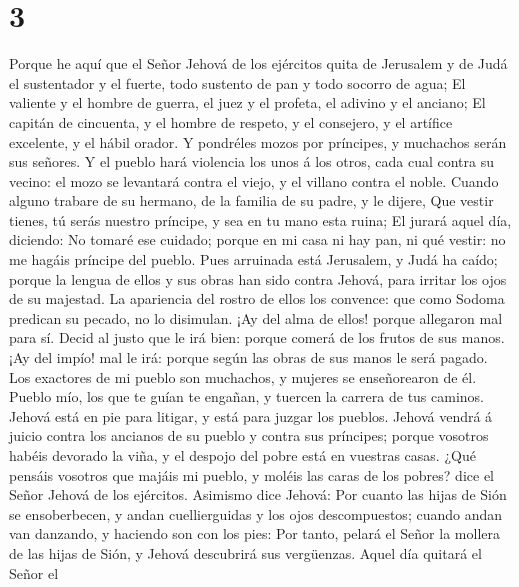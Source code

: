 \hypertarget{section-2}{%
\section{3}\label{section-2}}

 Porque he aquí que el Señor Jehová de los ejércitos quita
de Jerusalem y de Judá el sustentador y el fuerte, todo sustento de pan
y todo socorro de agua;  El valiente y el hombre de
guerra, el juez y el profeta, el adivino y el anciano;  El
capitán de cincuenta, y el hombre de respeto, y el consejero, y el
artífice excelente, y el hábil orador.  Y pondréles mozos
por príncipes, y muchachos serán sus señores.  Y el pueblo
hará violencia los unos á los otros, cada cual contra su vecino: el mozo
se levantará contra el viejo, y el villano contra el noble.
 Cuando alguno trabare de su hermano, de la familia de su
padre, y le dijere, Que vestir tienes, tú serás nuestro príncipe, y sea
en tu mano esta ruina;  El jurará aquel día, diciendo: No
tomaré ese cuidado; porque en mi casa ni hay pan, ni qué vestir: no me
hagáis príncipe del pueblo.  Pues arruinada está
Jerusalem, y Judá ha caído; porque la lengua de ellos y sus obras han
sido contra Jehová, para irritar los ojos de su majestad. 
La apariencia del rostro de ellos los convence: que como Sodoma predican
su pecado, no lo disimulan. ¡Ay del alma de ellos! porque allegaron mal
para sí.  Decid al justo que le irá bien: porque comerá
de los frutos de sus manos.  ¡Ay del impío! mal le irá:
porque según las obras de sus manos le será pagado.  Los
exactores de mi pueblo son muchachos, y mujeres se enseñorearon de él.
Pueblo mío, los que te guían te engañan, y tuercen la carrera de tus
caminos.  Jehová está en pie para litigar, y está para
juzgar los pueblos.  Jehová vendrá á juicio contra los
ancianos de su pueblo y contra sus príncipes; porque vosotros habéis
devorado la viña, y el despojo del pobre está en vuestras casas.
 ¿Qué pensáis vosotros que majáis mi pueblo, y moléis las
caras de los pobres? dice el Señor Jehová de los ejércitos.
 Asimismo dice Jehová: Por cuanto las hijas de Sión se
ensoberbecen, y andan cuellierguidas y los ojos descompuestos; cuando
andan van danzando, y haciendo son con los pies:  Por
tanto, pelará el Señor la mollera de las hijas de Sión, y Jehová
descubrirá sus vergüenzas.  Aquel día quitará el Señor el
